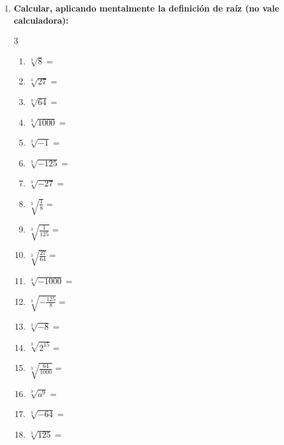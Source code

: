 \documentclass[a4paper,12pt]{article}
\begin{document}
\begin{enumerate}
    \item \textbf{Calcular, aplicando mentalmente la definición de raíz (no vale calculadora):}
    \begin{multicols}{3}
    \begin{enumerate}[label=\alph*)]
        \item $\sqrt[3]{8} =$
        \item $\sqrt[3]{27} =$
        \item $\sqrt[3]{64} =$
        \item $\sqrt[3]{1000} =$
        \item $\sqrt[3]{-1} =$
        \item $\sqrt[3]{-125} =$
        \item $\sqrt[3]{-27} =$
        \item $\sqrt[3]{\frac{1}{8}} =$
        \item $\sqrt[3]{\frac{1}{125}} =$
        \item $\sqrt[3]{\frac{27}{64}} =$
        \item $\sqrt[3]{-1000} =$
        \item $\sqrt[3]{-\frac{125}{8}} =$
        \item $\sqrt[3]{-8} =$
        \item $\sqrt[3]{2^{15}} =$
        \item $\sqrt[3]{\frac{64}{1000}} =$
        \item $\sqrt[3]{a^9} =$
        \item $\sqrt[3]{-64} =$
        \item $\sqrt[3]{125} =$
    \end{enumerate}
    \end{multicols}
\end{enumerate}
\end{document}
